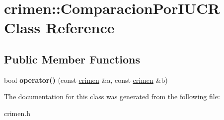\hypertarget{classcrimen_1_1ComparacionPorIUCR}{}\section{crimen\+:\+:Comparacion\+Por\+I\+U\+C\+R Class Reference}
\label{classcrimen_1_1ComparacionPorIUCR}
\subsection*{Public Member Functions}
\begin{DoxyCompactItemize}
\item 
\hypertarget{classcrimen_1_1ComparacionPorIUCR_a4483ecccb0bd90a9dcda38646dd2f463}{}bool {\bfseries operator()} (const \hyperlink{classcrimen}{crimen} \&a, const \hyperlink{classcrimen}{crimen} \&b)\label{classcrimen_1_1ComparacionPorIUCR_a4483ecccb0bd90a9dcda38646dd2f463}

\end{DoxyCompactItemize}


The documentation for this class was generated from the following file\+:\begin{DoxyCompactItemize}
\item 
crimen.\+h\end{DoxyCompactItemize}
